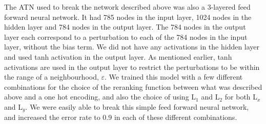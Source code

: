 \documentclass[12pt,a4paper]{article}
\begin{document}
The ATN used to break the network described above was also a 3-layered 
feed forward neural network. It had 785 nodes in the input layer, 1024 
nodes in the hidden layer and 784 nodes in the output layer. The 784 
nodes in the output layer each correspond to a perturbation to each of 
the 784 nodes in the input layer, without the bias term. We did not have 
any activations in the hidden layer and used tanh activation in the 
output layer. As mentioned earlier, tanh activations are used in the 
output layer to restrict the perturbations to be within the range of a 
neighbourhood, $\varepsilon $. We trained this model with a few 
different combinations for the choice of the reranking function between 
what was described above and a one hot encoding, and also the choice of 
using L$_{1}$ and L$_{2}$ for both L$_{x}$ and L$_{y}$. We 
were easily able to break this simple feed forward neural network, and 
increased the error rate to 0.9 in each of these different combinations.
\end{document}

